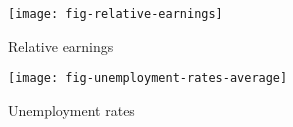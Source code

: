 \begin{frame}
	\begin{figure}[htp]\centering
		\caption{Relative earnings}\scalebox{0.35}
		{\texttt{[image: fig-relative-earnings]}}
	\end{figure}
\end{frame}
\begin{frame}
	\begin{figure}[htp]\centering
		\caption{Unemployment rates}\scalebox{0.35}
		{\texttt{[image: fig-unemployment-rates-average]}}
	\end{figure}
\end{frame}
